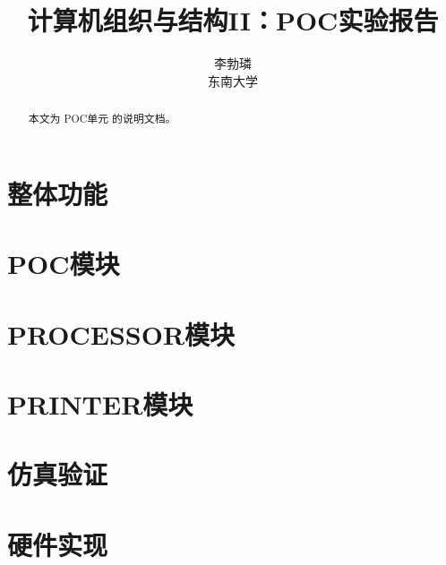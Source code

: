 \documentclass[lang=cn,a4paper,newtx]{elegantpaper}
\title{计算机组织与结构II：POC实验报告}
\author{李勃璘 \\ 东南大学}
\date{\zhdate{2025/3/18}}
\begin{document}
\maketitle

\begin{abstract}
本文为 POC单元 的说明文档。
\end{abstract}

\section{整体功能}
\section{POC模块}
\section{PROCESSOR模块}
\section{PRINTER模块}
\section{仿真验证}
\section{硬件实现}
\nocite{*}
\printbibliography[heading=bibintoc, title=\ebibname]

\appendix
\addappheadtotoc
\end{document}
